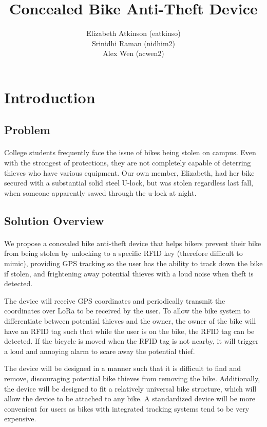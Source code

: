 \documentclass{article}
\title{Concealed Bike Anti-Theft Device}
\author{Elizabeth Atkinson (eatkinso)\\ Srinidhi Raman (nidhim2) \\ Alex Wen (acwen2)}
\begin{document}
\maketitle

\section{Introduction}
\subsection{Problem}

\paragraph{}
College students frequently face the issue of bikes being stolen on campus. Even with the strongest of protections, they are not completely capable of deterring thieves who have various equipment. Our own member, Elizabeth, had her bike secured with a substantial solid steel U-lock, but was stolen regardless last fall, when someone apparently sawed through the u-lock at night. 

\subsection{Solution Overview}
\paragraph{}
We propose a concealed bike anti-theft device that helps bikers prevent their bike from being stolen by unlocking to a specific RFID key (therefore difficult to mimic), providing GPS tracking so the user has the ability to track down the bike if stolen, and frightening away potential thieves with a loud noise when theft is detected.

The device will receive GPS coordinates and periodically transmit the coordinates over LoRa to be received by the user. To allow the bike system to differentiate between potential thieves and the owner, the owner of the bike will have an RFID tag such that while the user is on the bike, the RFID tag can be detected. If the bicycle is moved when the RFID tag is not nearby, it will trigger a loud and annoying alarm to scare away the potential thief.

The device will be designed in a manner such that it is difficult to find and remove, discouraging potential bike thieves from removing the bike. Additionally, the device will be designed to fit a relatively universal bike structure, which will allow the device to be attached to any bike. A standardized device will be more convenient for users as bikes with integrated tracking systems tend to be very expensive.
\end{document}
